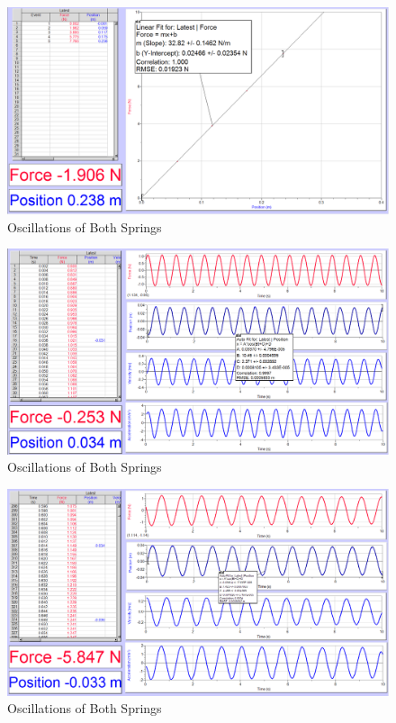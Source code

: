 \documentclass[]{article}
\begin{document}
\begin{figure}[H]
	\centering
	\includegraphics[width=\textwidth]{res/1_4_spring}
	\caption{Oscillations of Both Springs}
	\label{fig:Oscillations of Both Springs}
\end{figure}

\begin{figure}[H]
	\centering
	\includegraphics[width=\textwidth]{res/2_1_spring}
	\caption{Oscillations of Both Springs}
	\label{fig:Oscillations of Both Springs}
\end{figure}

\begin{figure}[H]
	\centering
	\includegraphics[width=\textwidth]{res/2_4_spring}
	\caption{Oscillations of Both Springs}
	\label{fig:Oscillations of Both Springs}
\end{figure}
\end{document}
